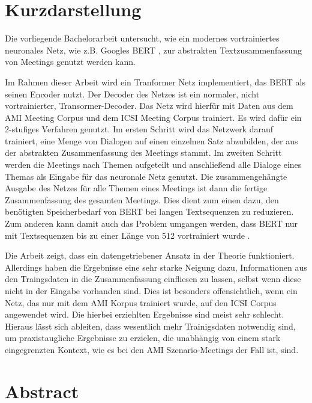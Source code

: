 \thispagestyle{empty}
\section*{Kurzdarstellung}
\label{sec:kurzdarstellung}

Die vorliegende Bachelorarbeit untersucht, wie ein modernes vortrainiertes neuronales Netz, wie z.B. Googles BERT \cite{devlin2018bert}, zur abstrakten Textzusammenfassung von Meetings genutzt werden kann.

Im Rahmen dieser Arbeit wird ein Tranformer Netz \cite{1706.03762} implementiert, das BERT als seinen Encoder nutzt.
Der Decoder des Netzes ist ein normaler, nicht vortrainierter, Transormer-Decoder.
Das Netz wird hierfür mit Daten aus dem AMI Meeting Corpus \cite{Mccowan05theami} und dem ICSI Meeting Corpus \cite{Janin} trainiert.
Es wird dafür ein 2-stufiges Verfahren genutzt.
Im ersten Schritt wird das Netzwerk darauf trainiert, eine Menge von Dialogen auf einen einzelnen Satz abzubilden, der aus der abstrakten Zusammenfassung des Meetings stammt.
Im zweiten Schritt werden die Meetings nach Themen aufgeteilt und anschließend alle Dialoge eines Themas als Eingabe für das neuronale Netz genutzt.
Die zusammengehängte Ausgabe des Netzes für alle Themen eines Meetings ist dann die fertige Zusammenfassung des gesamten Meetings.
Dies dient zum einen dazu, den benötigten Speicherbedarf von BERT bei langen Textsequenzen zu reduzieren.
Zum anderen kann damit auch das Problem umgangen werden, dass BERT nur mit Textsequenzen bis zu einer Länge von 512 vortrainiert wurde \cite[p.~13]{devlin2018bert}.

Die Arbeit zeigt, dass ein datengetriebener Ansatz in der Theorie funktioniert.
Allerdings haben die Ergebnisse eine sehr starke Neigung dazu, Informationen aus den Traingsdaten in die Zusammenfassung einfliesen zu lassen, selbst wenn diese nicht in der Eingabe vorhanden sind.
Dies ist besonders offensichtlich, wenn ein Netz, das nur mit dem AMI Korpus trainiert wurde, auf den ICSI Corpus angewendet wird.
Die hierbei erziehlten Ergebnisse sind meist sehr schlecht.
Hieraus lässt sich ableiten, dass wesentlich mehr Trainigsdaten notwendig sind, um praxistaugliche Ergebnisse zu erzielen, die unabhängig von einem stark eingegrenzten Kontext, wie es bei den AMI Szenario-Meetings der Fall ist, sind.


\section*{Abstract}
\label{sec:abstract}

